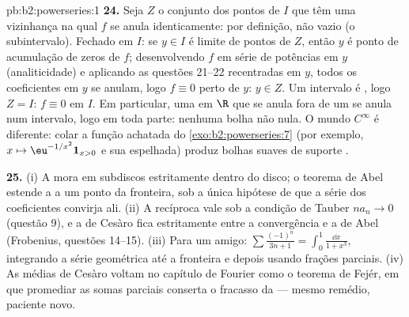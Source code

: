 \begin{solution}{pb:b2:powerseries:1}
\textbf{24.} Seja $Z$ o conjunto dos pontos de $I$ que têm uma
vizinhança na qual $f$ se anula identicamente:  por
definição, não vazio (o subintervalo). Fechado em $I$: se $y
\in I$ é limite de pontos de $Z$, então $y$ é ponto de
acumulação de zeros de $f$; desenvolvendo $f$ em série de potências em $y$
(analiticidade) e aplicando as questões 21--22 recentradas em $y$,
todos os coeficientes em $y$ se anulam, logo $f \equiv 0$ perto de $y$: $y
\in Z$. Um intervalo é , logo $Z = I$: $f \equiv 0$ em
$I$. Em particular, uma  em $\R$ que se anula
fora de um  se anula num intervalo, logo
em toda parte: nenhuma bolha  não nula. O mundo $C^\infty$ é
diferente: colar a função achatada do
\cref{exo:b2:powerseries:7} (por exemplo,\ $x \mapsto
\eu^{-1/x^2}\mathbf 1_{x>0}$ e sua espelhada) produz bolhas
suaves de suporte .

\textbf{25.} (i) A  mora em subdiscos 
estritamente dentro do disco; o teorema de Abel estende a  a
um ponto da fronteira, sob a única hipótese de que a série dos
coeficientes convirja ali. (ii) A recíproca vale
sob a condição de Tauber $na_n \to 0$ (questão 9), e a
 de Cesàro fica estritamente entre a convergência e a
 de Abel (Frobenius, questões 14--15). (iii) Para um
amigo: $\sum\frac{(-1)^n}{3n+1} = \int_0^1\frac{\dd x}{1+x^3}$,
integrando a série geométrica até a fronteira e depois usando
frações parciais. (iv) As médias de Cesàro voltam no capítulo de Fourier
como o teorema de Fejér, em que promediar as somas parciais
conserta o fracasso da  --- mesmo remédio,
paciente novo.
\end{solution}
